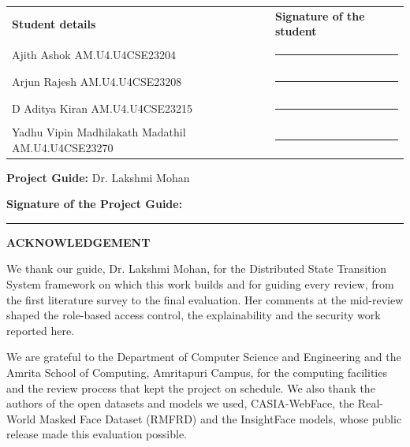 \documentclass[12pt,a4paper,oneside]{report}
\begin{document}
\noindent
\begin{tabular}{@{}p{}p{}@{}}
\textbf{Student details} & \textbf{Signature of the student} \\[14pt]

Ajith Ashok\newline
AM.U4.U4CSE23204
& \rule{0.30\textwidth}{0.4pt} \\[18pt]

Arjun Rajesh\newline
AM.U4.U4CSE23208
& \rule{0.30\textwidth}{0.4pt} \\[18pt]

D Aditya Kiran\newline
AM.U4.U4CSE23215
& \rule{0.30\textwidth}{0.4pt} \\[18pt]

Yadhu Vipin Madhilakath Madathil\newline
AM.U4.U4CSE23270
& \rule{0.30\textwidth}{0.4pt}
\end{tabular}

\vspace{0.8cm}

\noindent
\textbf{Project Guide:} Dr. Lakshmi Mohan

\vspace{0.5cm}

\noindent
\textbf{Signature of the Project Guide:}
\rule{4cm}{0.4pt}

\clearpage

\clearpage
\clearpage
{}
\pagestyle{plain}

{}
{\centering \Large\bfseries ACKNOWLEDGEMENT\par}
We thank our guide, Dr. Lakshmi Mohan, for the Distributed State Transition System framework on which this work builds and for guiding every review, from the first literature survey to the final evaluation. Her comments at the mid-review shaped the role-based access control, the explainability and the security work reported here.

We are grateful to the Department of Computer Science and Engineering and the Amrita School of Computing, Amritapuri Campus, for the computing facilities and the review process that kept the project on schedule. We also thank the authors of the open datasets and models we used, CASIA-WebFace, the Real-World Masked Face Dataset (RMFRD) and the InsightFace models, whose public release made this evaluation possible.
\end{document}

